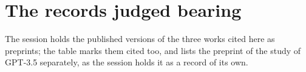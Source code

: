 \section{The records judged bearing}
\label{sec:llm-hits}

The session holds the published versions of the three works cited here
as preprints; the table marks them cited too, and lists the preprint of
the study of GPT-3.5 separately, as the session holds it as a record of
its own.


